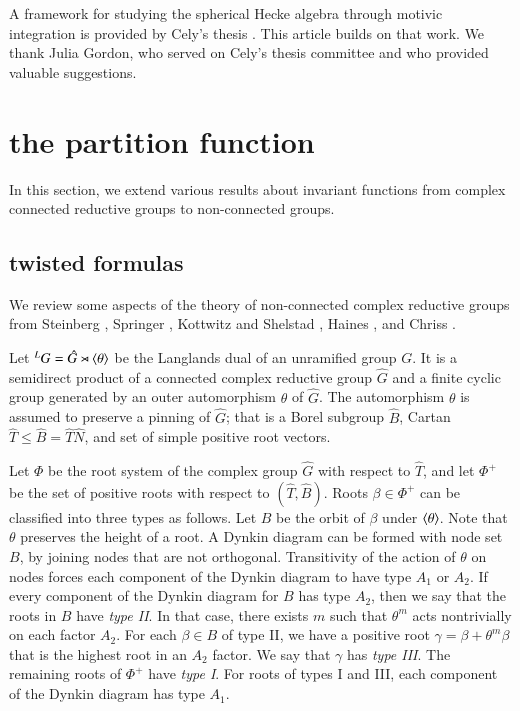 A framework for studying the spherical Hecke algebra through motivic integration is provided by Cely's thesis \cite{cely}.
This article builds on that work.  We thank Julia Gordon, who served on Cely's thesis committee and who provided valuable suggestions.


\section{the partition function}


In this section, we extend various results about invariant functions from
complex connected reductive groups to non-connected groups.



\subsection{twisted formulas}

We review some aspects of the  theory of non-connected complex reductive groups from
Steinberg \cite{steinberg1968endomorphisms},  Springer \cite{springer2010linear},
Kottwitz and Shelstad \cite{kottwitz1999foundations}, 
Haines \cite{haines2016dualities}, and
 Chriss \cite{chriss}.





Let ${}^LG = \hat G \rtimes \langle{\theta}\rangle$ be the Langlands dual of an unramified group $G$.
It is a semidirect product of a connected complex reductive group $\hat G$ and a finite cyclic group
generated by an outer automorphism $\theta$ of $\hat G$.  The automorphism $\theta$ is assumed
to preserve a pinning of $\hat G$; that is a Borel subgroup $\hat B$, Cartan $\hat T\le \hat B=\hat T\hat N$, and
set of simple positive root vectors.  

Let $\Phi$ be the root system of the complex group $\hat G$ with respect to $\hat T$, and let
$\Phi^+$ be the set of positive roots with respect to $(\hat T,\hat B)$.
  Roots $\beta\in\Phi^+$ can be classified into three types as follows.  Let $B$ be the orbit of $\beta$ under
$\langle{\theta}\rangle$.  Note that $\theta$ preserves the height of a root.
A Dynkin diagram can be formed with node set $B$, by joining nodes that are not orthogonal.  
Transitivity of the action of $\theta$ on nodes forces each component of the Dynkin diagram to have type $A_1$
or $A_2$.  If every component of the Dynkin diagram for $B$  has type $A_2$, then we say that the roots in $B$
have {\it type II}.  In that case, there exists $m$ such that  $\theta^m$ acts nontrivially
on each factor $A_2$.   For each $\beta\in B$ of type II, we have a positive root $\gamma = \beta+\theta^m\beta$ that
is the highest root in an $A_2$ factor.  We say that $\gamma$ has {\it type III}.
The remaining roots of $\Phi^+$ have {\it type I}.  For roots of
types I and III, each component of the Dynkin diagram has type $A_1$.

